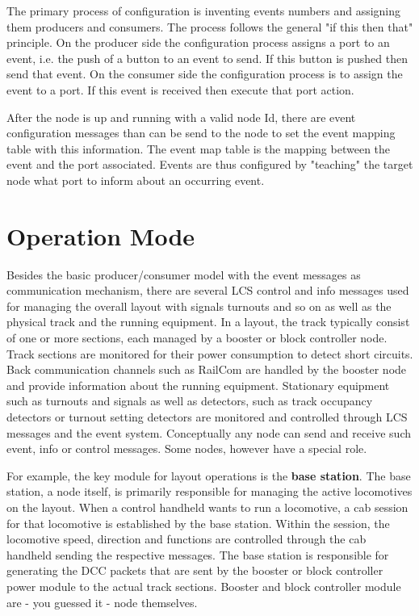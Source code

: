 The primary process of configuration is inventing events numbers and assigning them producers and consumers. The process follows the general "if this then that" principle. On the producer side the configuration process assigns a port to an event, i.e. the push of a button to an event to send. If this button is pushed then send that event. On the consumer side the configuration process is to assign the event to a port. If this event is received then execute that port action.

After the node is up and running with a valid node Id, there are event configuration messages than can be send to the node to set the event mapping table with this information. The event map table is the mapping between the event and the port associated. Events are thus configured by "teaching" the target node what port to inform about an occurring event.

\section{Operation Mode}

Besides the basic producer/consumer model with the event messages as communication mechanism, there are several LCS control and info messages used for managing the overall layout with signals turnouts and so on as well as the physical track and the running equipment. In a layout, the track typically consist of one or more sections, each managed by a booster or block controller node. Track sections are monitored for their power consumption to detect short circuits. Back communication channels such as RailCom are handled by the booster node and provide information about the running equipment. Stationary equipment such as turnouts and signals as well as detectors, such as track occupancy detectors or turnout setting detectors are monitored and controlled through LCS messages and the event system. Conceptually any node can send and receive such event, info or control messages. Some nodes, however have a special role.

For example, the key module for layout operations is the {\bf base station}. The base station, a node itself, is primarily responsible for managing the active locomotives on the layout. When a control handheld wants to run a locomotive, a cab session for that locomotive is established by the base station. Within the session, the locomotive speed, direction and functions are controlled through the cab handheld sending the respective messages. The base station is responsible for generating the DCC packets that are sent by the booster or block controller power module to the actual track sections. Booster and block controller module are - you guessed it - node themselves.

